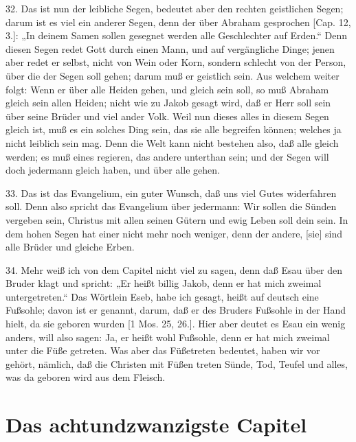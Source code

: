32. Das ist nun der leibliche Segen, bedeutet aber den rechten geistlichen Segen; darum ist es viel ein anderer Segen, denn der über Abraham gesprochen [Cap. 12, 3.]: „In deinem Samen sollen gesegnet werden alle Geschlechter auf Erden.“ Denn diesen Segen redet Gott durch einen Mann, und auf vergängliche Dinge; jenen aber redet er selbst, nicht von Wein oder Korn, sondern schlecht von der Person, über die der Segen soll gehen; darum muß er geistlich sein. Aus welchem weiter folgt: Wenn er über alle Heiden gehen, und gleich sein soll, so muß Abraham gleich sein allen Heiden; nicht wie zu Jakob gesagt wird, daß er Herr soll sein über seine Brüder und viel ander Volk. Weil nun dieses alles in diesem Segen gleich ist, muß es ein solches Ding sein, das sie alle begreifen können; welches ja nicht leiblich sein mag. Denn die Welt kann nicht bestehen also, daß alle gleich werden; es muß eines regieren, das andere unterthan sein; und der Segen will doch jedermann gleich haben, und über alle gehen.

33. Das ist das Evangelium, ein guter Wunsch, daß uns viel Gutes widerfahren soll. Denn also spricht das Evangelium über jedermann: Wir sollen die Sünden vergeben sein, Christus mit allen seinen Gütern und ewig Leben soll dein sein. In dem hohen Segen hat einer nicht mehr noch weniger, denn der andere, [sie] sind alle Brüder und gleiche Erben.

34. Mehr weiß ich von dem Capitel nicht viel zu sagen, denn daß Esau über den Bruder klagt und spricht: „Er heißt billig Jakob, denn er hat mich zweimal untergetreten.“ Das Wörtlein Eseb, habe ich gesagt, heißt auf deutsch eine Fußsohle; davon ist er genannt, darum, daß er des Bruders Fußsohle in der Hand hielt, da sie geboren wurden [1 Mos. 25, 26.]. Hier aber deutet es Esau ein wenig anders, will also sagen: Ja, er heißt wohl Fußsohle, denn er hat mich zweimal unter die Füße getreten. Was aber das Füßetreten bedeutet, haben wir vor gehört, nämlich, daß die Christen mit Füßen treten Sünde, Tod, Teufel und alles, was da geboren wird aus dem Fleisch.

\section{Das achtundzwanzigste Capitel}

